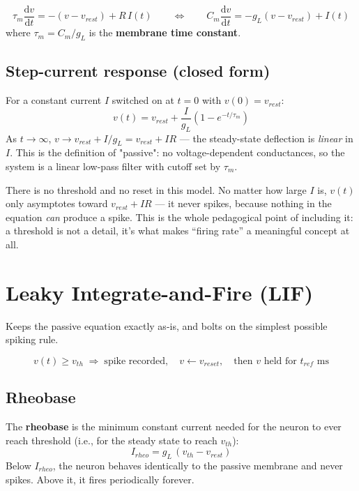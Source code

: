 \documentclass[11pt,a4paper]{article}
\newcommand{\dd}{\mathrm{d}}
\begin{document}
\begin{eqbox}
$$\tau_m \frac{\dd v}{\dd t} = -(v - v_{rest}) + R\,I(t) \qquad\Longleftrightarrow\qquad C_m \frac{\dd v}{\dd t} = -g_L(v - v_{rest}) + I(t)$$
where $\tau_m = C_m/g_L$ is the \textbf{membrane time constant}.
\end{eqbox}

\subsection{Step-current response (closed form)}
For a constant current $I$ switched on at $t=0$ with $v(0)=v_{rest}$:
$$v(t) = v_{rest} + \frac{I}{g_L}\left(1 - e^{-t/\tau_m}\right)$$
As $t \to \infty$, $v \to v_{rest} + I/g_L = v_{rest} + IR$ — the steady-state deflection is \emph{linear} in $I$. This is the definition of "passive": no voltage-dependent conductances, so the system is a linear low-pass filter with cutoff set by $\tau_m$.

\begin{keybox}
There is no threshold and no reset in this model. No matter how large $I$ is, $v(t)$ only asymptotes toward $v_{rest}+IR$ — it never spikes, because nothing in the equation \emph{can} produce a spike. This is the whole pedagogical point of including it: a threshold is not a detail, it's what makes ``firing rate'' a meaningful concept at all.
\end{keybox}

\section{Leaky Integrate-and-Fire (LIF)}
Keeps the passive equation exactly as-is, and bolts on the simplest possible spiking rule.

\begin{eqbox}
$$v(t) \geq v_{th} \;\Longrightarrow\; \text{spike recorded}, \quad v \leftarrow v_{reset}, \quad \text{then } v \text{ held for } t_{ref}\text{ ms}$$
\end{eqbox}

\subsection{Rheobase}
The \textbf{rheobase} is the minimum constant current needed for the neuron to ever reach threshold (i.e., for the steady state to reach $v_{th}$):
$$I_{rheo} = g_L\,(v_{th} - v_{rest})$$
Below $I_{rheo}$, the neuron behaves identically to the passive membrane and never spikes. Above it, it fires periodically forever.
\end{document}
